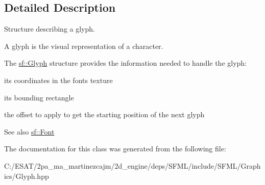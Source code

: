 \subsection{Detailed Description}
Structure describing a glyph. 

A glyph is the visual representation of a character.

The \hyperlink{classsf_1_1_glyph}{sf\+::\+Glyph} structure provides the information needed to handle the glyph\+: \begin{DoxyItemize}
\item its coordinates in the font\textquotesingle{}s texture \item its bounding rectangle \item the offset to apply to get the starting position of the next glyph\end{DoxyItemize}
\begin{DoxySeeAlso}{See also}
\hyperlink{classsf_1_1_font}{sf\+::\+Font} 
\end{DoxySeeAlso}


The documentation for this class was generated from the following file\+:\begin{DoxyCompactItemize}
\item 
C\+:/\+E\+S\+A\+T/2pa\+\_\+ma\+\_\+martinezcajm/2d\+\_\+engine/deps/\+S\+F\+M\+L/include/\+S\+F\+M\+L/\+Graphics/Glyph.\+hpp\end{DoxyCompactItemize}
